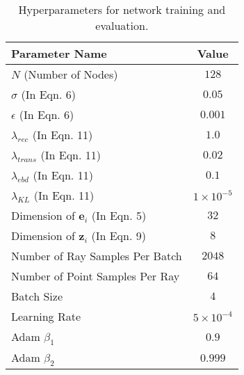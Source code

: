 \begin{table}
    \footnotesize
    \centering
    \caption{Hyperparameters for network training and evaluation. }
    \begin{tabular}{lc}
    \toprule
       Parameter Name & Value \\
    \midrule
       $N$ (Number of Nodes)                        & $128$ \\
       $\sigma$ (In Eqn. 6)                         & $0.05$ \\
       $\epsilon$ (In Eqn. 6)                       & $0.001$ \\
       $\lambda_{rec}$ (In Eqn. 11)                  & $1.0$ \\
       $\lambda_{trans}$ (In Eqn. 11)                & $0.02$ \\
       $\lambda_{ebd}$ (In Eqn. 11)                  & $0.1$ \\
       $\lambda_{KL}$ (In Eqn. 11)                   & $1\times 10^{-5}$ \\
       Dimension of $\bm{e}_i$ (In Eqn. 5)          & $32$  \\
       Dimension of $\bm{z}_i$ (In Eqn. 9)          & $8$  \\
       Number of Ray Samples Per Batch              & $2048$ \\
       Number of Point Samples Per Ray              & $64$ \\
       Batch Size                                   & $4$ \\
       Learning Rate                                & $5\times 10^{-4}$  \\
       Adam $\beta_1$                               & $0.9$ \\
       Adam $\beta_2$                               & $0.999$ \\
    \bottomrule
    \end{tabular}
    \label{tab:training_details}
\end{table}



